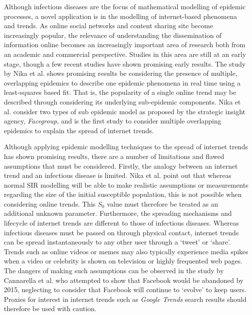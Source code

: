 Although infectious diseases are the focus of mathematical modelling
of epidemic processes, a novel application is in the modelling of
internet-based phenomena and trends. As online social networks and
content sharing site become increasingly popular, the relevance of
understanding the dissemination of information online becomes an
increasingly important area of research both from an academic and
commercial perspective.\cite{cannarella, facebook} Studies in this
area are still at an early stage, though a few recent studies have
shown promising early results. \cite{marily2013, marily2014, bieber}
The study by Nika et al. shows promising results be considering the
presence of multiple, overlapping epidemics to describe one epidemic
phenomena in real time using a least-squares based fit. That is, the
popularity of a single online trend may be described through
considering its underlying sub-epidemic components. Nika et
al. consider two types of sub epidemic model as proposed by the
strategic insight agency, \emph{Facegroup}, and is the first study to
consider multiple overlapping epidemics to explain the spread of
internet trends. 

Although applying epidemic modelling techniques to the spread of
internet trends has shown promising results, there are a number of
limitations and flawed assumptions that must be considered. Firstly,
the analogy between an internet trend and an infectious disease is
limited. Nika et al. point out that whereas normal SIR modelling will
be able to make realistic assumptions or measurements regarding the
size of the initial susceptible population, this is not possible when
considering online trends. This $S_0$ value must therefore be treated
as an additional unknown parameter.\cite{marily2013} Furthermore, the
spreading mechanisms and lifecycle of internet trends are different to
those of infectious diseases. Whereas infectious diseases must be
passed on through physical contact, internet trends can be spread
instantaneously to any other user through a `tweet' or `share'. Trends
such as online videos or memes may also typically experience media
spikes when a video or celebrity is shown on television or highly
frequented web pages. The dangers of making such assumptions can be
observed in the study by Cannarella et al. who attempted to show that
Facebook would be abandoned by 2015, neglecting to consider that
Facebook will continue to `evolve' to keep users.\cite{cannarella,
  facebook} Proxies for interest in internet trends such as
\emph{Google Trends} search results should therefore be used with
caution.


